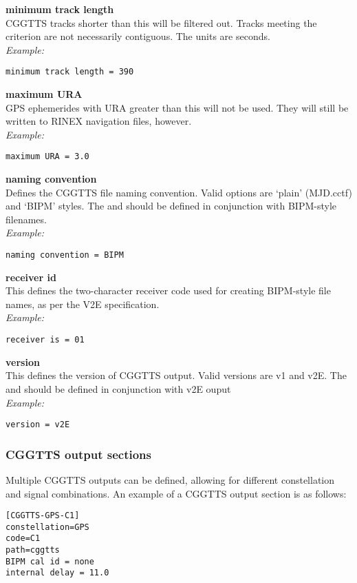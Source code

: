 {\bfseries minimum track length}\\
CGGTTS tracks shorter than this will be filtered out. Tracks meeting the criterion are not necessarily contiguous.
The units are seconds.\\
\textit{Example:}
\begin{lstlisting}
minimum track length = 390
\end{lstlisting}

{\bfseries maximum URA}\\
GPS ephemerides with URA greater than this will not be used. 
They will still be written to RINEX navigation files, however.\\
\textit{Example:}
\begin{lstlisting}
maximum URA = 3.0
\end{lstlisting}

{\bfseries naming convention}\\
Defines the CGGTTS file naming convention. Valid options are `plain' (MJD.cctf) and `BIPM' styles.
The  and  should be defined in conjunction with BIPM-style filenames.\\
\textit{Example:}
\begin{lstlisting}
naming convention = BIPM
\end{lstlisting}

{\bfseries receiver id}\\
This defines the two-character receiver code used for creating BIPM-style file names, 
as per the V2E specification.\\
\textit{Example:}
\begin{lstlisting}
receiver is = 01
\end{lstlisting}

{\bfseries version}\\
This defines the version of CGGTTS output. Valid versions are v1 and v2E. 
The  and  should be defined in conjunction with v2E ouput\\
\textit{Example:}
\begin{lstlisting}
version = v2E
\end{lstlisting}


\subsubsection{CGGTTS output sections}

Multiple CGGTTS outputs can be defined, allowing for different constellation and signal combinations.
An example of a CGGTTS output section is as follows:
\begin{lstlisting}
[CGGTTS-GPS-C1]
constellation=GPS
code=C1
path=cggtts
BIPM cal id = none
internal delay = 11.0
\end{lstlisting}

